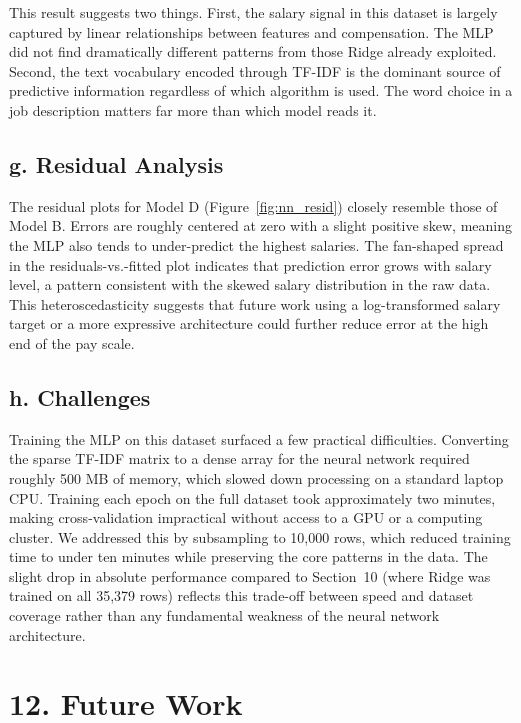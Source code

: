 \documentclass[11pt]{article}
\begin{document}
This result suggests two things. First, the salary signal in this dataset is largely captured by linear relationships between features and compensation. The MLP did not find dramatically different patterns from those Ridge already exploited. Second, the text vocabulary encoded through TF-IDF is the dominant source of predictive information regardless of which algorithm is used. The word choice in a job description matters far more than which model reads it.

\subsection*{g. Residual Analysis}

The residual plots for Model D (Figure~\ref{fig:nn_resid}) closely resemble those of Model B. Errors are roughly centered at zero with a slight positive skew, meaning the MLP also tends to under-predict the highest salaries. The fan-shaped spread in the residuals-vs.-fitted plot indicates that prediction error grows with salary level, a pattern consistent with the skewed salary distribution in the raw data. This heteroscedasticity suggests that future work using a log-transformed salary target or a more expressive architecture could further reduce error at the high end of the pay scale.

\subsection*{h. Challenges}

Training the MLP on this dataset surfaced a few practical difficulties. Converting the sparse TF-IDF matrix to a dense array for the neural network required roughly 500 MB of memory, which slowed down processing on a standard laptop CPU. Training each epoch on the full dataset took approximately two minutes, making cross-validation impractical without access to a GPU or a computing cluster. We addressed this by subsampling to 10{,}000 rows, which reduced training time to under ten minutes while preserving the core patterns in the data. The slight drop in absolute performance compared to Section~10 (where Ridge was trained on all 35{,}379 rows) reflects this trade-off between speed and dataset coverage rather than any fundamental weakness of the neural network architecture.


\section*{12. Future Work}
\end{document}
